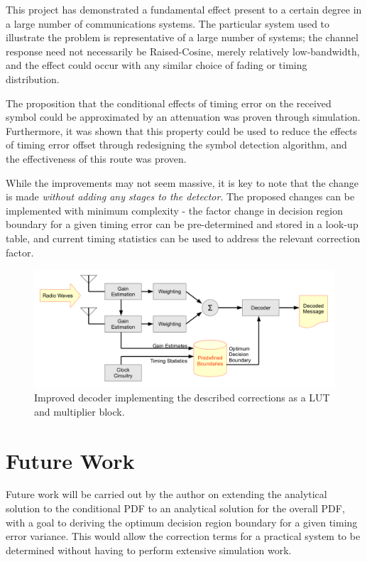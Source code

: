This project has demonstrated a fundamental effect present to a certain degree in a large number of communications systems. The particular system used to illustrate the problem is representative of a large number of systems; the channel response need not necessarily be Raised-Cosine, merely relatively low-bandwidth, and the effect could occur with any similar choice of fading or timing distribution.

The proposition that the conditional effects of timing error on the received symbol could be approximated by an attenuation was proven through simulation. Furthermore, it was shown that this property could be used to reduce the effects of timing error offset through redesigning the symbol detection algorithm, and the effectiveness of this route was proven.

While the improvements may not seem massive, it is key to note that the change is made \emph{without adding any stages to the detector}. The proposed changes can be implemented with minimum complexity - the factor change in decision region boundary for a given timing error can be pre-determined and stored in a look-up table,  and current timing statistics can be used to address the relevant correction factor.

\begin{figure}[htbp]
\centering
\includegraphics[width=\linewidth]{system.png}
\caption[Improved decoder implementation]{Improved decoder implementing the described corrections as a LUT and multiplier block.}
\end{figure}

\chapter{Future Work}

Future work will be carried out by the author on extending the analytical solution to the conditional PDF to an analytical solution for the overall PDF, with a goal to deriving the optimum decision region boundary for a given timing error variance. This would allow the correction terms for a practical system to be determined without having to perform extensive simulation work.

